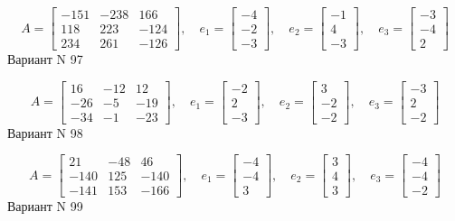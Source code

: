 \documentclass[11pt]{report}
\begin{document}
$$A = \left[\begin{matrix}-151 & -238 & 166\\118 & 223 & -124\\234 & 261 & -126\end{matrix}\right],\quad e_1 = \left[\begin{matrix}-4\\-2\\-3\end{matrix}\right],\quad e_2 = \left[\begin{matrix}-1\\4\\-3\end{matrix}\right],\quad e_3 = \left[\begin{matrix}-3\\-4\\2\end{matrix}\right]$$Вариант N 97

$$A = \left[\begin{matrix}16 & -12 & 12\\-26 & -5 & -19\\-34 & -1 & -23\end{matrix}\right],\quad e_1 = \left[\begin{matrix}-2\\2\\-3\end{matrix}\right],\quad e_2 = \left[\begin{matrix}3\\-2\\-2\end{matrix}\right],\quad e_3 = \left[\begin{matrix}-3\\2\\-2\end{matrix}\right]$$Вариант N 98

$$A = \left[\begin{matrix}21 & -48 & 46\\-140 & 125 & -140\\-141 & 153 & -166\end{matrix}\right],\quad e_1 = \left[\begin{matrix}-4\\-4\\3\end{matrix}\right],\quad e_2 = \left[\begin{matrix}3\\4\\3\end{matrix}\right],\quad e_3 = \left[\begin{matrix}-4\\-4\\-2\end{matrix}\right]$$Вариант N 99
\end{document}
